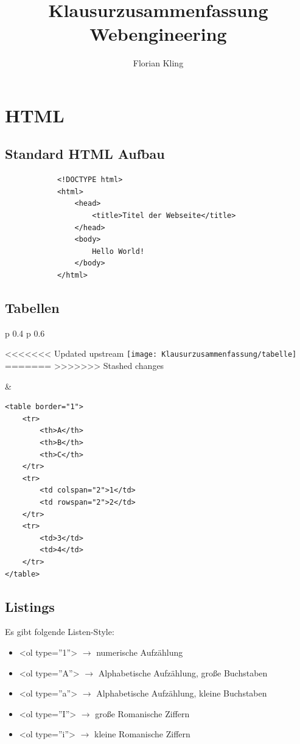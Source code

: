 \documentclass[11pt]{article}
\begin{document}
	
	\title{Klausurzusammenfassung Webengineering}
	\author{Florian Kling}
	
	\maketitle
	
	\newpage
	
	
	\section{HTML}
	
		\subsection{Standard HTML Aufbau}
		
		\begin{lstlisting}
			<!DOCTYPE html>
			<html>
				<head>
					<title>Titel der Webseite</title>
				</head>
				<body>
					Hello World!
				</body>
			</html>
		\end{lstlisting}
		
		
		\subsection{Tabellen}
	

			\begin{tabular}{p {0.4 \textwidth}  p {0.6 \textwidth} }
				\begin{center}
<<<<<<< Updated upstream
					\texttt{[image: Klausurzusammenfassung/tabelle]}
=======
>>>>>>> Stashed changes
				\end{center}
			
			& 	
				\begin{lstlisting}
<table border="1">
	<tr>
		<th>A</th>
		<th>B</th>
		<th>C</th>
	</tr>
	<tr>
		<td colspan="2">1</td>
		<td rowspan="2">2</td>
	</tr>
	<tr>
		<td>3</td>
		<td>4</td>
	</tr>
</table>
				\end{lstlisting}
			\end{tabular}
	
		\subsection{Listings}
		
			Es gibt folgende Listen-Style:
			
			\begin{itemize}
				\item <ol type=''1''> $\rightarrow$ numerische Aufzählung
				\item <ol type=''A''> $\rightarrow$ Alphabetische Aufzählung, große Buchstaben
				\item <ol type=''a''> $\rightarrow$ Alphabetische Aufzählung, kleine Buchstaben
				\item <ol type=''I''> $\rightarrow$ große Romanische Ziffern
				\item <ol type=''i''> $\rightarrow$ kleine Romanische Ziffern
			\end{itemize}
			
\end{document}
